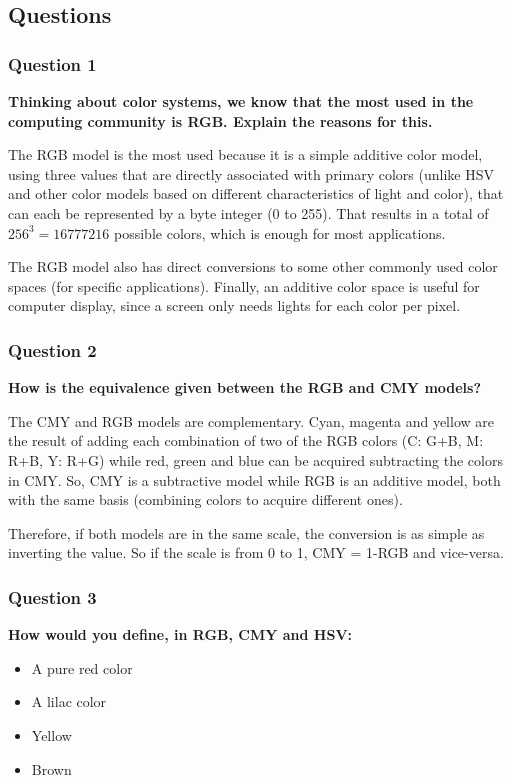 \documentclass[12pt]{article}
\begin{document}
\subsection{Questions}
\subsubsection*{Question 1}
{\bfseries Thinking about color systems, we know that the most used in the computing community is RGB. Explain the reasons for this.}

The RGB model is the most used because it is a simple additive color model, using three values that are directly associated with primary colors (unlike HSV and other color models based on different characteristics of light and color), that can each be represented by a byte integer (0 to 255). That results in a total of $256^3 = 16777216$ possible colors, which is enough for most applications. 

The RGB model also has direct conversions to some other commonly used color spaces (for specific applications). Finally, an additive color space is useful for computer display, since a screen only needs lights for each color per pixel.

\subsubsection*{Question 2}
{\bfseries How is the equivalence given between the RGB and CMY models?}

The CMY and RGB models are complementary. Cyan, magenta and yellow are the result of adding each combination of two of the RGB colors (C: G+B, M: R+B, Y: R+G) while red, green and blue can be acquired subtracting the colors in CMY. So, CMY is a subtractive model while RGB is an additive model, both with the same basis (combining colors to acquire different ones).

Therefore, if both models are in the same scale, the conversion is as simple as inverting the value. So if the scale is from 0 to 1, CMY = 1-RGB and vice-versa.

\subsubsection*{Question 3}
{\bfseries How would you define, in RGB, CMY and HSV:
\begin{itemize}
\item A pure red color
\item A lilac color
\item Yellow
\item Brown
\end{itemize}}
\end{document}
